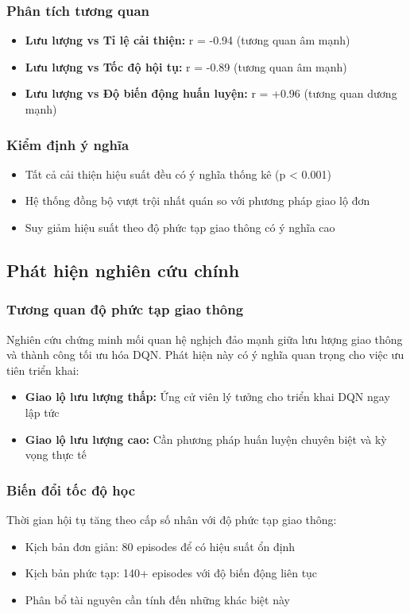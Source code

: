 \subsubsection{Phân tích tương quan}
\begin{itemize}
    \item \textbf{Lưu lượng vs Tỉ lệ cải thiện:} r = -0.94 (tương quan âm mạnh)
    \item \textbf{Lưu lượng vs Tốc độ hội tụ:} r = -0.89 (tương quan âm mạnh)
    \item \textbf{Lưu lượng vs Độ biến động huấn luyện:} r = +0.96 (tương quan dương mạnh)
\end{itemize}

\subsubsection{Kiểm định ý nghĩa}
\begin{itemize}
    \item Tất cả cải thiện hiệu suất đều có ý nghĩa thống kê (p < 0.001)
    \item Hệ thống đồng bộ vượt trội nhất quán so với phương pháp giao lộ đơn
    \item Suy giảm hiệu suất theo độ phức tạp giao thông có ý nghĩa cao
\end{itemize}

\subsection{Phát hiện nghiên cứu chính}

\subsubsection{Tương quan độ phức tạp giao thông}
Nghiên cứu chứng minh mối quan hệ nghịch đảo mạnh giữa lưu lượng giao thông và
thành công tối ưu hóa DQN. Phát hiện này có ý nghĩa quan trọng cho việc ưu tiên triển khai:
\begin{itemize}
    \item \textbf{Giao lộ lưu lượng thấp:} Ứng cử viên lý tưởng cho triển khai DQN ngay lập tức
    \item \textbf{Giao lộ lưu lượng cao:} Cần phương pháp huấn luyện chuyên biệt và kỳ vọng thực tế
\end{itemize}

\subsubsection{Biến đổi tốc độ học}
Thời gian hội tụ tăng theo cấp số nhân với độ phức tạp giao thông:
\begin{itemize}
    \item Kịch bản đơn giản: 80 episodes để có hiệu suất ổn định
    \item Kịch bản phức tạp: 140+ episodes với độ biến động liên tục
    \item Phân bổ tài nguyên cần tính đến những khác biệt này
\end{itemize}

